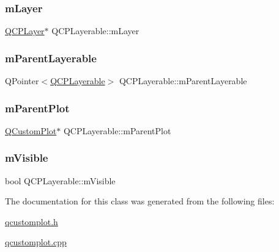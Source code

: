 \subsubsection{\texorpdfstring{m\+Layer}{mLayer}}
{\footnotesize\ttfamily \hyperlink{class_q_c_p_layer}{Q\+C\+P\+Layer}$\ast$ Q\+C\+P\+Layerable\+::m\+Layer\hspace{0.3cm}{\ttfamily [protected]}}

\mbox{\label{class_q_c_p_layerable_a3291445a980053e2d17a21d15957624e}} 
\subsubsection{\texorpdfstring{m\+Parent\+Layerable}{mParentLayerable}}
{\footnotesize\ttfamily Q\+Pointer$<$\hyperlink{class_q_c_p_layerable}{Q\+C\+P\+Layerable}$>$ Q\+C\+P\+Layerable\+::m\+Parent\+Layerable\hspace{0.3cm}{\ttfamily [protected]}}

\mbox{\label{class_q_c_p_layerable_aa2a528433e44db02b8aef23c1f9f90ed}} 
\subsubsection{\texorpdfstring{m\+Parent\+Plot}{mParentPlot}}
{\footnotesize\ttfamily \hyperlink{class_q_custom_plot}{Q\+Custom\+Plot}$\ast$ Q\+C\+P\+Layerable\+::m\+Parent\+Plot\hspace{0.3cm}{\ttfamily [protected]}}

\mbox{\label{class_q_c_p_layerable_a62e3aed8427d6ce3ccf716f285106cb3}} 
\subsubsection{\texorpdfstring{m\+Visible}{mVisible}}
{\footnotesize\ttfamily bool Q\+C\+P\+Layerable\+::m\+Visible\hspace{0.3cm}{\ttfamily [protected]}}



The documentation for this class was generated from the following files\+:\begin{DoxyCompactItemize}
\item 
\hyperlink{qcustomplot_8h}{qcustomplot.\+h}\item 
\hyperlink{qcustomplot_8cpp}{qcustomplot.\+cpp}\end{DoxyCompactItemize}
